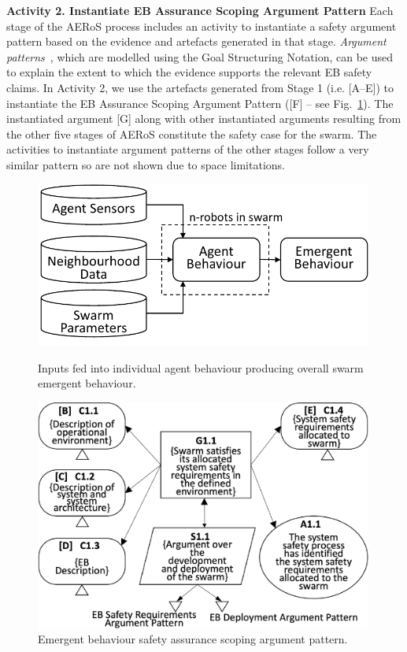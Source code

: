 \documentclass[runningheads]{llncs}
\begin{document}
	\noindent\textbf{Activity 2. Instantiate EB Assurance Scoping Argument Pattern} Each stage of the AERoS process includes an activity to instantiate a safety argument pattern based on the evidence and artefacts generated in that stage.  
	\emph{Argument patterns}~\cite{Hawkins2021}, which are modelled using the Goal Structuring Notation, can be used to explain the extent to which the evidence supports the relevant EB safety claims. 
	In Activity 2, we use the artefacts generated from Stage 1 (i.e. [A–E]) to instantiate the EB Assurance Scoping Argument Pattern ([F] – see Fig.~\ref{stage1-ap}). 
	The instantiated argument [G] along with other instantiated arguments resulting from the other five stages of AERoS constitute the safety case for the swarm. The activities to instantiate argument patterns of the other stages follow a very similar pattern so are not shown due to space limitations.
	\begin{figure}[!t]
		\centering
		\begin{minipage}[b]{.45\textwidth}
			\centering
			\includegraphics[width=0.99\textwidth]{figures/stage1-systema-v2.pdf} 
			\caption{Inputs fed into individual agent behaviour producing overall swarm emergent behaviour.}
			\label{system-description}
		\end{minipage}%
		\hspace*{0.03\textwidth}
		\begin{minipage}[b]{.52\textwidth}
			\centering
			\includegraphics[width=0.99\textwidth]{figures/stage1-argumentpattern-v3.pdf}%
			\vspace{-2ex}
			\caption{Emergent behaviour safety assurance scoping argument pattern.}
			\label{stage1-ap}
		\end{minipage}	
	\end{figure}
	
\end{document}
